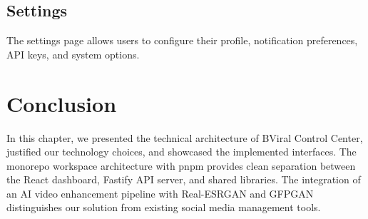 \subsection{Settings}

The settings page allows users to configure their profile, notification preferences, API keys, and system options.


\section*{Conclusion}
In this chapter, we presented the technical architecture of BViral Control Center, justified our technology choices, and showcased the implemented interfaces. The monorepo workspace architecture with pnpm provides clean separation between the React dashboard, Fastify API server, and shared libraries. The integration of an AI video enhancement pipeline with Real-ESRGAN and GFPGAN distinguishes our solution from existing social media management tools.
